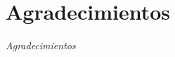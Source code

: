 

\chapter{Agradecimientos}

\emph{Agradecimientos}

\clearpage
\thispagestyle{empty}
\mbox{}
\newpage
\endinput

